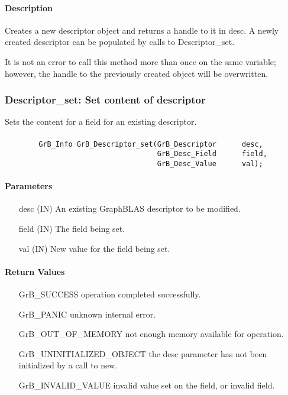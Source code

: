 \paragraph{Description}

Creates a new descriptor object and returns a handle to it in {\sf desc}.
A newly created descriptor can be populated by calls to {\sf Descriptor\_set}.

It is not an error to call this method more than once on the same variable;  
however, the handle to the previously created object will be overwritten. 


\subsubsection{{\sf Descriptor\_set}: Set content of descriptor}

Sets the content for a field for an existing descriptor.

\paragraph{\syntax}

\begin{verbatim}
        GrB_Info GrB_Descriptor_set(GrB_Descriptor      desc,
                                    GrB_Desc_Field      field,
                                    GrB_Desc_Value      val);
\end{verbatim}

\paragraph{Parameters}

\begin{itemize}[leftmargin=1.1in]
    \item[{\sf desc}]  ({\sf IN}) An existing GraphBLAS descriptor to be modified.
    \item[{\sf field}] ({\sf IN}) The field being set.
    \item[{\sf val}]   ({\sf IN}) New value for the field being set.
\end{itemize}

\paragraph{Return Values}

\begin{itemize}[leftmargin=2.1in]
\item[{\sf GrB\_SUCCESS}]           operation completed successfully.
\item[{\sf GrB\_PANIC}]             unknown internal error.
\item[{\sf GrB\_OUT\_OF\_MEMORY}]          not enough memory available for operation.
\item[{\sf GrB\_UNINITIALIZED\_OBJECT}]          the {\sf desc} parameter has not been
                                    initialized by a call to {\sf new}.
\item[{\sf GrB\_INVALID\_VALUE}]    invalid value set on the field, or invalid field.
\end{itemize}

